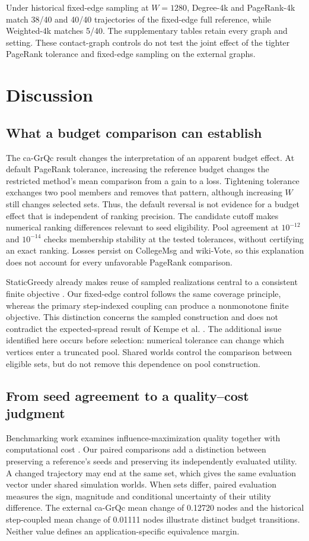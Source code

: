 \documentclass[smallextended]{svjour3}
\begin{document}
Under historical fixed-edge sampling at $W=1280$, Degree-4k and PageRank-4k match 38/40 and 40/40 trajectories of the fixed-edge full reference, while Weighted-4k matches 5/40. The supplementary tables retain every graph and setting. These contact-graph controls do not test the joint effect of the tighter PageRank tolerance and fixed-edge sampling on the external graphs.
\FloatBarrier

\section{Discussion}
\subsection{What a budget comparison can establish}
The ca-GrQc result changes the interpretation of an apparent budget effect. At default PageRank tolerance, increasing the reference budget changes the restricted method's mean comparison from a gain to a loss. Tightening tolerance exchanges two pool members and removes that pattern, although increasing $W$ still changes selected sets. Thus, the default reversal is not evidence for a budget effect that is independent of ranking precision. The candidate cutoff makes numerical ranking differences relevant to seed eligibility. Pool agreement at $10^{-12}$ and $10^{-14}$ checks membership stability at the tested tolerances, without certifying an exact ranking. Losses persist on CollegeMsg and wiki-Vote, so this explanation does not account for every unfavorable PageRank comparison.

StaticGreedy already makes reuse of sampled realizations central to a consistent finite objective \cite{ref8}. Our fixed-edge control follows the same coverage principle, whereas the primary step-indexed coupling can produce a nonmonotone finite objective. This distinction concerns the sampled construction and does not contradict the expected-spread result of Kempe et al. \cite{ref1}. The additional issue identified here occurs before selection: numerical tolerance can change which vertices enter a truncated pool. Shared worlds control the comparison between eligible sets, but do not remove this dependence on pool construction.

\subsection{From seed agreement to a quality--cost judgment}
Benchmarking work examines influence-maximization quality together with computational cost \cite{ref16}. Our paired comparisons add a distinction between preserving a reference's seeds and preserving its independently evaluated utility. A changed trajectory may end at the same set, which gives the same evaluation vector under shared simulation worlds. When sets differ, paired evaluation measures the sign, magnitude and conditional uncertainty of their utility difference. The external ca-GrQc mean change of 0.12720 nodes and the historical step-coupled mean change of 0.01111 nodes illustrate distinct budget transitions. Neither value defines an application-specific equivalence margin.
\end{document}

